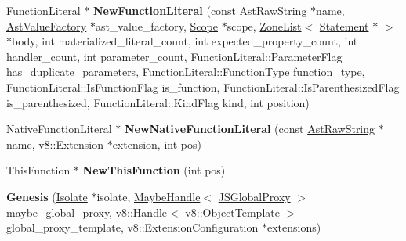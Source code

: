 \begin{DoxyCompactItemize}
\item 
\hypertarget{classv8_1_1internal_1_1_b_a_s_e___e_m_b_e_d_d_e_d_a292c05480797ee7a57ba43cb46ac6a87}{}Function\+Literal $\ast$ {\bfseries New\+Function\+Literal} (const \hyperlink{classv8_1_1internal_1_1_ast_raw_string}{Ast\+Raw\+String} $\ast$name, \hyperlink{classv8_1_1internal_1_1_ast_value_factory}{Ast\+Value\+Factory} $\ast$ast\+\_\+value\+\_\+factory, \hyperlink{classv8_1_1internal_1_1_scope}{Scope} $\ast$scope, \hyperlink{classv8_1_1internal_1_1_zone_list}{Zone\+List}$<$ \hyperlink{classv8_1_1internal_1_1_statement}{Statement} $\ast$ $>$ $\ast$body, int materialized\+\_\+literal\+\_\+count, int expected\+\_\+property\+\_\+count, int handler\+\_\+count, int parameter\+\_\+count, Function\+Literal\+::\+Parameter\+Flag has\+\_\+duplicate\+\_\+parameters, Function\+Literal\+::\+Function\+Type function\+\_\+type, Function\+Literal\+::\+Is\+Function\+Flag is\+\_\+function, Function\+Literal\+::\+Is\+Parenthesized\+Flag is\+\_\+parenthesized, Function\+Literal\+::\+Kind\+Flag kind, int position)\label{classv8_1_1internal_1_1_b_a_s_e___e_m_b_e_d_d_e_d_a292c05480797ee7a57ba43cb46ac6a87}

\item 
\hypertarget{classv8_1_1internal_1_1_b_a_s_e___e_m_b_e_d_d_e_d_a02d1063bfec4b4050fb947b86ed22334}{}Native\+Function\+Literal $\ast$ {\bfseries New\+Native\+Function\+Literal} (const \hyperlink{classv8_1_1internal_1_1_ast_raw_string}{Ast\+Raw\+String} $\ast$name, v8\+::\+Extension $\ast$extension, int pos)\label{classv8_1_1internal_1_1_b_a_s_e___e_m_b_e_d_d_e_d_a02d1063bfec4b4050fb947b86ed22334}

\item 
\hypertarget{classv8_1_1internal_1_1_b_a_s_e___e_m_b_e_d_d_e_d_a6fab2e30f0408e373d0f7bcc812089e9}{}This\+Function $\ast$ {\bfseries New\+This\+Function} (int pos)\label{classv8_1_1internal_1_1_b_a_s_e___e_m_b_e_d_d_e_d_a6fab2e30f0408e373d0f7bcc812089e9}

\item 
\hypertarget{classv8_1_1internal_1_1_b_a_s_e___e_m_b_e_d_d_e_d_a5a5bd9399f1314a3749b5b3dcc88f475}{}{\bfseries Genesis} (\hyperlink{classv8_1_1internal_1_1_isolate}{Isolate} $\ast$isolate, \hyperlink{classv8_1_1internal_1_1_maybe_handle}{Maybe\+Handle}$<$ \hyperlink{classv8_1_1internal_1_1_j_s_global_proxy}{J\+S\+Global\+Proxy} $>$ maybe\+\_\+global\+\_\+proxy, \hyperlink{classv8_1_1_handle}{v8\+::\+Handle}$<$ v8\+::\+Object\+Template $>$ global\+\_\+proxy\+\_\+template, v8\+::\+Extension\+Configuration $\ast$extensions)\label{classv8_1_1internal_1_1_b_a_s_e___e_m_b_e_d_d_e_d_a5a5bd9399f1314a3749b5b3dcc88f475}


\end{DoxyCompactItemize}
